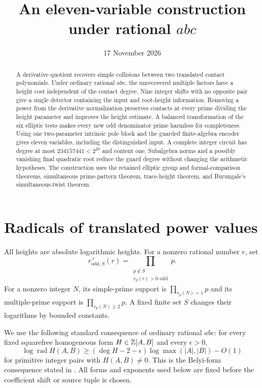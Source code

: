 \documentclass[11pt,a4paper]{article}
\title{An eleven-variable construction under rational \texorpdfstring{$abc$}{abc}}
\author{}\date{17 November 2026}
\DeclareMathOperator{\rad}{rad}\DeclareMathOperator{\Tr}{Tr}
\begin{document}
\maketitle

\begin{abstract}
A derivative quotient recovers simple collisions between two translated
contact polynomials. Under ordinary rational $abc$, the unrecovered
multiple factors have a height cost independent of the contact degree.
Nine integer shifts with no opposite pair give a single detector
containing the input and root-height information. Removing a power
from the derivative normalization preserves contacts at every prime
dividing the height parameter and improves the height estimate. A balanced transformation of the six elliptic
tests makes every new odd denominator prime harmless for completeness.
Using one two-parameter intrinsic pole block and the guarded finite-algebra
encoder gives eleven variables, including the distinguished input.
A complete integer circuit has degree at most $234157441<2^{28}$ and
content one. Subalgebra norms and a possibly vanishing final quadratic
root reduce the guard degree without changing the arithmetic hypotheses.
The construction uses the retained elliptic group and formal-comparison
theorems, simultaneous prime-pattern theorem, trace-height theorem, and
Burungale's simultaneous-twist theorem.
\end{abstract}

\section{Radicals of translated power values}

All heights are absolute logarithmic heights. For a nonzero rational
number $r$, set
\[
 r^+_{\mathrm{odd},S}(r)=
 \prod_{\substack{p\notin S\\v_p(r)>0\text{ odd}}}p.
\]
For a nonzero integer $N$, its simple-prime support is
$\prod_{v_p(N)=1}p$ and its multiple-prime support is
$\prod_{v_p(N)\ge2}p$. A fixed finite set $S$ changes their logarithms
by bounded constants.

We use the following standard consequence of ordinary rational $abc$:
for every fixed squarefree homogeneous form $H\in\mathbb Z[A,B]$ and every
$\epsilon>0$,
\begin{equation}\label{eq:polyabc}
 \log\rad H(A,B)\ge(\deg H-2-\epsilon)\log\max(|A|,|B|)-O(1)
\end{equation}
for primitive integer pairs with $H(A,B)\ne0$.
This is the Belyi-form consequence stated in
\cite[Appendix A.2, equation (A.2)]{RSZ}.
All forms and exponents used below are fixed before the coefficient
shift or source tuple is chosen.
\end{document}
